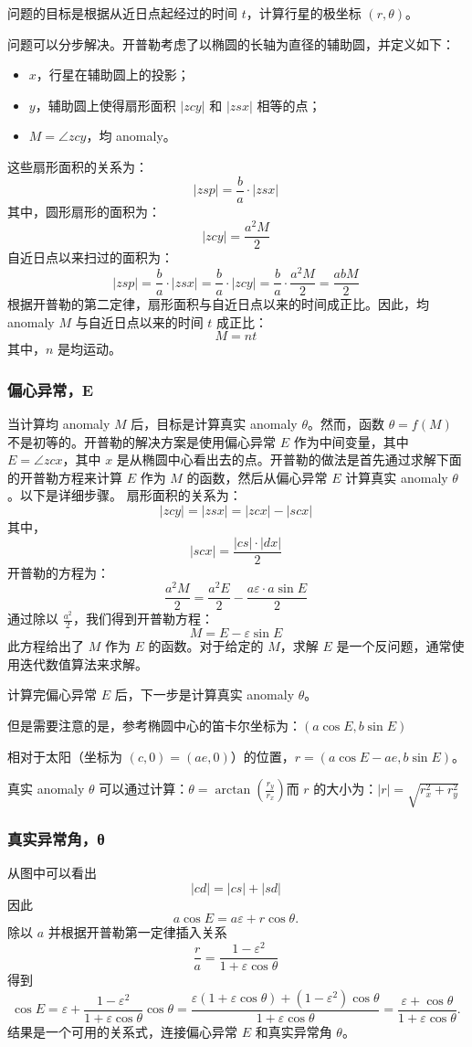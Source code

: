 问题的目标是根据从近日点起经过的时间 \( t \)，计算行星的极坐标 \( (r, \theta) \)。

问题可以分步解决。开普勒考虑了以椭圆的长轴为直径的辅助圆，并定义如下：
\begin{itemize}
\item \(x\)，行星在辅助圆上的投影；
\item \(y\)，辅助圆上使得扇形面积 \(|zcy|\) 和 \(|zsx|\) 相等的点；
\item \( M = \angle zcy \)，均 anomaly。
\end{itemize}
这些扇形面积的关系为：
\[
|zsp| = \frac{b}{a} \cdot |zsx|~
\]
其中，圆形扇形的面积为：
\[
|zcy| = \frac{a^2 M}{2}~
\]
自近日点以来扫过的面积为：
\[
|zsp| = \frac{b}{a} \cdot |zsx| = \frac{b}{a} \cdot |zcy| = \frac{b}{a} \cdot \frac{a^2 M}{2} = \frac{abM}{2}~
\]
根据开普勒的第二定律，扇形面积与自近日点以来的时间成正比。因此，均 anomaly \( M \) 与自近日点以来的时间 \( t \) 成正比：
\[
M = nt~
\]
其中，\( n \) 是均运动。
\subsubsection{偏心异常，E}

当计算均 anomaly \( M \) 后，目标是计算真实 anomaly \( \theta \)。然而，函数 \( \theta = f(M) \) 不是初等的。开普勒的解决方案是使用偏心异常 \( E \) 作为中间变量，其中 \( E = \angle zcx \)，其中 \( x \) 是从椭圆中心看出去的点。开普勒的做法是首先通过求解下面的开普勒方程来计算 \( E \) 作为 \( M \) 的函数，然后从偏心异常 \( E \) 计算真实 anomaly \( \theta \)。以下是详细步骤。
扇形面积的关系为：
\[
|zcy| = |zsx| = |zcx| - |scx|~
\]
其中，
\[
|scx| = \frac{|cs| \cdot |dx|}{2}~
\]
开普勒的方程为：
\[
\frac{a^2 M}{2} = \frac{a^2 E}{2} - \frac{a \varepsilon \cdot a \sin E}{2}~
\]
通过除以 \( \frac{a^2}{2} \)，我们得到开普勒方程：
\[
M = E - \varepsilon \sin E~
\]
此方程给出了 \( M \) 作为 \( E \) 的函数。对于给定的 \( M \)，求解 \( E \) 是一个反问题，通常使用迭代数值算法来求解。

计算完偏心异常 \( E \) 后，下一步是计算真实 anomaly \( \theta \)。

但是需要注意的是，参考椭圆中心的笛卡尔坐标为：\((a \cos E, b \sin E)\)

相对于太阳（坐标为 \( (c, 0) = (ae, 0) \)）的位置，\( r = (a \cos E - ae, b \sin E) \)。

真实 anomaly \( \theta \) 可以通过计算：\(\theta = \arctan \left( \frac{r_y}{r_x} \right)\)而 \( r \) 的大小为：\(|r| = \sqrt{r_x^2 + r_y^2}\)
\subsubsection{真实异常角，θ}  
从图中可以看出  
\[
|cd| = |cs| + |sd|~
\]
因此  
\[
a \cos E = a\varepsilon + r \cos \theta.~
\]
除以 \(a\) 并根据开普勒第一定律插入关系  
\[
\frac{r}{a} = \frac{1 - \varepsilon^2}{1 + \varepsilon \cos \theta}~
\]
得到  
\[
\cos E = \varepsilon + \frac{1 - \varepsilon^2}{1 + \varepsilon \cos \theta} \cos \theta = \frac{\varepsilon (1 + \varepsilon \cos \theta) + (1 - \varepsilon^2) \cos \theta}{1 + \varepsilon \cos \theta} = \frac{\varepsilon + \cos \theta}{1 + \varepsilon \cos \theta}.~
\]
结果是一个可用的关系式，连接偏心异常 \(E\) 和真实异常角 \(\theta\)。

